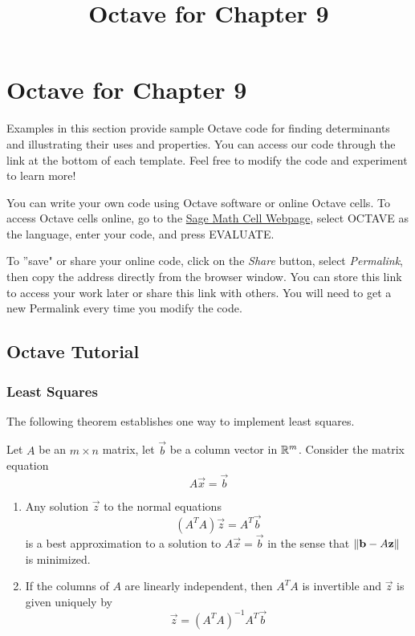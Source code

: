 \documentclass{ximera}
\title{Octave for Chapter 9} \license{CC BY-NC-SA 4.0}
\begin{document}
\begin{abstract}
\end{abstract}
\maketitle

\section*{Octave for Chapter 9}

Examples in this section provide sample Octave code for finding determinants and illustrating their uses and properties. You can access our code through the link at the bottom of each template.  Feel free to modify the code and experiment to learn more!  

You can write your own code using Octave software or online Octave cells.  To access Octave cells online, go to the \href{https://sagecell.sagemath.org/}{Sage Math Cell Webpage}, select OCTAVE as the language, enter your code, and press EVALUATE.  

To ''save" or share your online code, click on the \emph{Share} button, select \emph{Permalink}, then copy the address directly from the browser window.  You can store this link to access your work later or share this link with others.  You will need to get a new Permalink every time you modify the code.

\subsection*{Octave Tutorial}
\subsubsection*{Least Squares}
The following theorem establishes one way to implement least squares.

\begin{theorem}[\ref{th:bestApprox}]
    Let $A$ be an $m\times n$ matrix, let $\vec{b}$ be a column vector in $\mathbb{R}^m$.  Consider the matrix equation
    $$A\vec{x}=\vec{b}$$
    \begin{enumerate}
        \item Any solution $\vec{z}$ to the normal equations
        $$\left(A^TA\right)\vec{z}=A^T\vec{b}$$
        is a best approximation to a solution to $A\vec{x}=\vec{b}$ in the sense that $\left\lVert\mathbf{b}-A\mathbf{z}\right\rVert$ is minimized.
        \item If the columns of $A$ are linearly independent, then $A^TA$ is invertible and $\vec{z}$ is given uniquely by
        $$\vec{z}=\left(A^TA\right)^{-1}A^T\vec{b}$$
    \end{enumerate}
    \end{theorem}
\end{document}
